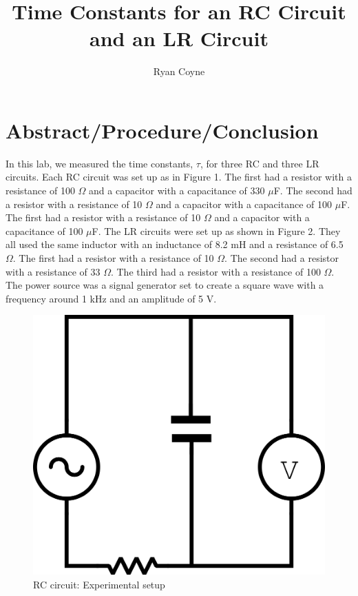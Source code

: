 \documentclass[12pt]{article}
\begin{document}
    \title{Time Constants for an RC Circuit and an LR Circuit}
    \author{Ryan Coyne}
    \maketitle

    \section{Abstract/Procedure/Conclusion}
        In this lab, we measured the time constants, \(\tau\), for three RC and three LR circuits. Each RC circuit was set up as in Figure 1. The first had a resistor with a resistance of 100 \(\Omega\) and a capacitor with a capacitance of 330 \(\mu\)F. The second had a resistor with a resistance of 10 \(\Omega\) and a capacitor with a capacitance of 100 \(\mu\)F. The first had a resistor with a resistance of 10 \(\Omega\) and a capacitor with a capacitance of 100 \(\mu\)F. The LR circuits were set up as shown in Figure 2. They all used the same inductor with an inductance of 8.2 mH and a resistance of 6.5 \(\Omega\). The first had a resistor with a resistance of 10 \(\Omega\). The second had a resistor with a resistance of 33 \(\Omega\). The third had a resistor with a resistance of 100 \(\Omega\). The power source was a signal generator set to create a square wave with a frequency around 1 kHz and an amplitude of 5 V.
    \begin{figure}[H]
        \centering
        \includegraphics{RCSetup.png}
        \caption{RC circuit: Experimental setup}
    \end{figure}
\end{document}
